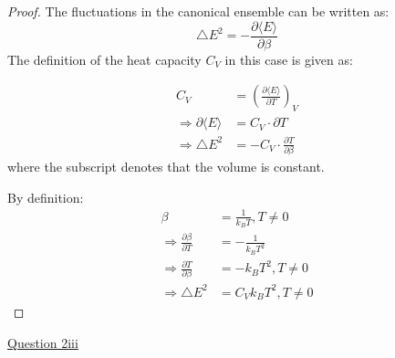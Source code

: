 \documentclass[11pt]{article}
\begin{document}
\begin{proof}
    The fluctuations in the canonical ensemble can be written as: 
    \begin{equation}
        \triangle E^2 = - \frac{\partial \langle E \rangle}{\partial \beta}
    \end{equation}
    The definition of the heat capacity $C_V$ in this case is given as: 
    
    \begin{equation}
        \begin{aligned}
            C_V &= \left(\frac{\partial \langle E \rangle}{\partial T} \right)_V \\
            \Rightarrow \partial \langle E \rangle &= C_V \cdot \partial T \\
            \Rightarrow \triangle E^2 &= - C_V \cdot \frac{\partial T}{\partial \beta}
        \end{aligned}
    \end{equation}
    where the subscript denotes that the volume is constant.

    By definition:
    \begin{equation}
            \begin{aligned}
                \beta &= \frac{1}{k_BT}, T\neq 0 \\
                \Rightarrow \frac{\partial \beta}{\partial T} &= - \frac{1}{k_BT^2} \\
                \Rightarrow \frac{\partial T}{\partial \beta} &= -k_BT^2, T\neq 0 \\
                \Rightarrow \triangle E^2 &= C_V k_B T^2, T \neq 0
            \end{aligned}
    \end{equation}
    
\end{proof}

\underline{Question 2iii}
\end{document}
